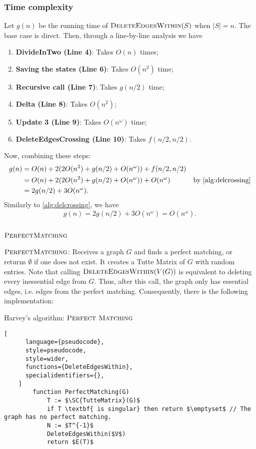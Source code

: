 \subsubsection{Time complexity}
\noindent
Let \(g(n)\) be the running time of \(\textsc{DeleteEdgesWithin}(S)\) when \(|S| = n\).
The base case is direct.
Then, through a line-by-line analysis we have
\begin{enumerate}
  \item \textbf{DivideInTwo (Line 4)}: Takes \(O(n)\) times;
  \item \textbf{Saving the states (Line 6)}: Takes \(O(n^2)\) time;
  \item \textbf{Recursive call (Line 7)}: Takes \(g(n/2)\) time;
  \item \textbf{Delta (Line 8)}: Takes \(O(n^2)\);
  \item \textbf{Update 3 (Line 9)}: Takes \(O(n^\omega)\) time;
  \item \textbf{DeleteEdgesCrossing (Line 10)}: Takes \(f(n/2, n/2)\).
\end{enumerate}
Now, combining these steps:
\begin{align*}
    g(n) &= O(n) + 2 (2O(n^2) + g(n / 2) + O(n^\omega)) + f(n/2, n/2) &  \\
    &= O(n) + 2 (2O(n^2) + g(n / 2) + O(n^\omega)) + O(n^\omega) & \text{by \eqref{alg:delcrossing}} \\
    &= 2g(n / 2) + 3O(n^\omega).
\end{align*}
Similarly to \eqref{alg:delcrossing}, we have
\begin{equation}
\label{alg:delwithin}
  g(n) = 2g(n / 2) + 3O(n^\omega) = O(n^\omega).
\end{equation}

\subsection{\(\SC{PerfectMatching}\)}

\(\SC{PerfectMatching}\): Receives a graph \(G\) and finds a perfect matching, or returns \(\emptyset\) if one does not exist.
It creates a Tutte Matrix of \(G\) with random entries.
Note that calling \(\textsc{DeleteEdgesWithin}(V(G))\) is equivalent to deleting every inessential edge from \(G\).
Thus, after this call, the graph only has essential edges, i.e. edges from the perfect matching. 
Consequently, there is the following implementation:

\begin{programruledcaption}{Harvey's algorithm: \(\SC{Perfect Matching}\)}
    \begin{lstlisting}[
      language={pseudocode},
      style=pseudocode,
      style=wider,
      functions={DeleteEdgesWithin},
      specialidentifiers={},
    ]
        function PerfectMatching(G)
            T := $\SC{TutteMatrix}(G)$
            if T \textbf{ is singular} then return $\emptyset$ // The graph has no perfect matching.
            N := $T^{-1}$
            DeleteEdgesWithin($V$)
            return $E(T)$
    \end{lstlisting}
\end{programruledcaption}

